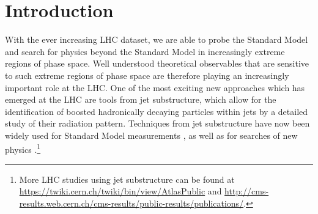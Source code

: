 \documentclass[11pt,letterpaper]{article}
\begin{document}
\maketitle

\section{Introduction}\label{sec:intro}

With the ever increasing LHC dataset, we are able to probe the Standard Model and search for physics beyond the Standard Model in increasingly extreme regions of phase space. Well understood theoretical observables that are sensitive to such extreme regions of phase space are therefore playing an increasingly important role at the LHC. One of the most exciting new approaches which has emerged at the LHC are tools from jet substructure, which allow for the identification of boosted hadronically decaying particles within jets by a detailed study of their radiation pattern. Techniques from jet substructure have now been widely used for Standard Model measurements \cite{Chatrchyan:2012sn,CMS:2013cda,Aad:2015cua,Aad:2015lxa,ATLAS-CONF-2015-035,Aad:2015rpa,Aad:2015hna,ATLAS-CONF-2016-002,ATLAS-CONF-2016-039,ATLAS-CONF-2016-034,CMS-PAS-TOP-16-013,CMS-PAS-HIG-16-004}, as well as for searches of new physics  \cite{CMS:2011bqa,Fleischmann:2013woa,Pilot:2013bla,TheATLAScollaboration:2013qia,Chatrchyan:2012ku,CMS-PAS-B2G-14-001,CMS-PAS-B2G-14-002,Khachatryan:2015axa,Khachatryan:2015bma,Aad:2015owa,Aaboud:2016okv,Aaboud:2016trl,Aaboud:2016qgg,ATLAS-CONF-2016-055,ATLAS-CONF-2015-071,ATLAS-CONF-2015-068,CMS-PAS-EXO-16-037,CMS-PAS-EXO-16-040,Khachatryan:2016mdm,CMS-PAS-HIG-16-016,CMS-PAS-B2G-15-003,CMS-PAS-EXO-16-017}.\footnote{More LHC studies using jet substructure can be found at \url{https://twiki.cern.ch/twiki/bin/view/AtlasPublic} and \url{http://cms-results.web.cern.ch/cms-results/public-results/publications/}.} 
\end{document}

